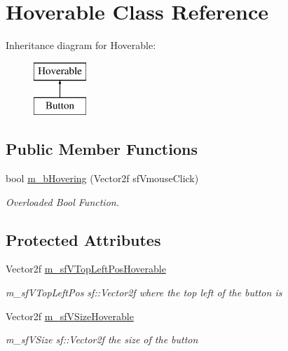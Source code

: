 \hypertarget{class_hoverable}{}\section{Hoverable Class Reference}
\label{class_hoverable}
Inheritance diagram for Hoverable\+:\begin{figure}[H]
\begin{center}
\leavevmode
\includegraphics[height=2.000000cm]{class_hoverable}
\end{center}
\end{figure}
\subsection*{Public Member Functions}
\begin{DoxyCompactItemize}
\item 
bool \hyperlink{class_hoverable_a5b2698e36a45fc22a0a45c74608213c5}{m\+\_\+b\+Hovering} (Vector2f sf\+Vmouse\+Click)
\begin{DoxyCompactList}\small\item\em Overloaded Bool Function. \end{DoxyCompactList}\end{DoxyCompactItemize}
\subsection*{Protected Attributes}
\begin{DoxyCompactItemize}
\item 
\hypertarget{class_hoverable_a890c220cc9b6929f72853454aa96cc73}{}\label{class_hoverable_a890c220cc9b6929f72853454aa96cc73} 
Vector2f \hyperlink{class_hoverable_a890c220cc9b6929f72853454aa96cc73}{m\+\_\+sf\+V\+Top\+Left\+Pos\+Hoverable}
\begin{DoxyCompactList}\small\item\em m\+\_\+sf\+V\+Top\+Left\+Pos sf\+::\+Vector2f where the top left of the button is \end{DoxyCompactList}\item 
\hypertarget{class_hoverable_a5134e5e8ed1b8d0d3ba7a0a05fb1f955}{}\label{class_hoverable_a5134e5e8ed1b8d0d3ba7a0a05fb1f955} 
Vector2f \hyperlink{class_hoverable_a5134e5e8ed1b8d0d3ba7a0a05fb1f955}{m\+\_\+sf\+V\+Size\+Hoverable}
\begin{DoxyCompactList}\small\item\em m\+\_\+sf\+V\+Size sf\+::\+Vector2f the size of the button \end{DoxyCompactList}\end{DoxyCompactItemize}


